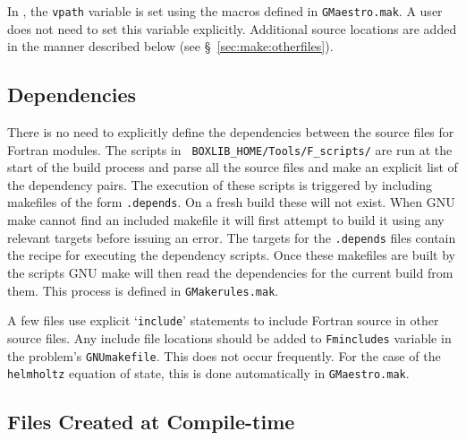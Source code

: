In \maestro, the {\tt vpath} variable is set using the macros defined
in {\tt GMaestro.mak}.  A user does not need to set this variable
explicitly.  Additional source locations are added in the manner
described below (see \S~\ref{sec:make:otherfiles}).

\subsection{Dependencies}

There is no need to explicitly define the dependencies between the
source files for Fortran modules.  The scripts in {\tt
BOXLIB\_HOME/Tools/F\_scripts/} are run at the start of the build
process and parse all the source files and make an explicit list of
the dependency pairs.  The execution of these scripts is triggered
by including makefiles of the form {\tt *.depends}.  On a fresh build these
will not exist.  When GNU make cannot find an included makefile it will
first attempt to build it using any relevant targets before issuing an 
error.  The targets for the {\tt *.depends} files contain the recipe for
executing the dependency scripts.  Once these makefiles are built by the
scripts GNU make will then read the dependencies for the current build
from them.  This process is defined in {\tt GMakerules.mak}.

A few files use explicit `{\tt include}' statements to include Fortran
source in other source files.  Any include file locations should be
added to {\tt Fmincludes} variable in the problem's {\tt GNUmakefile}.
This does not occur frequently.  For the case of the {\tt helmholtz}
equation of state, this is done automatically in {\tt GMaestro.mak}.


\subsection{Files Created at Compile-time}

